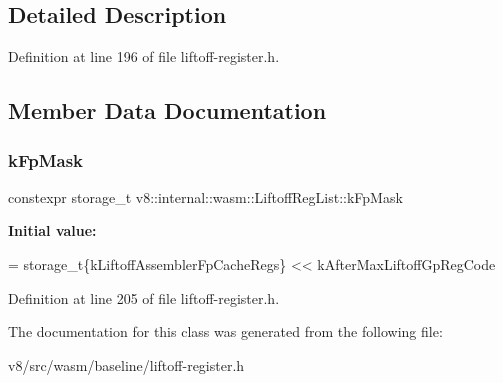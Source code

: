 \subsection{Detailed Description}


Definition at line 196 of file liftoff-\/register.\+h.



\subsection{Member Data Documentation}
\mbox{\label{classv8_1_1internal_1_1wasm_1_1LiftoffRegList_a27209310c19f408fe933ab1fe99edc1a}} 
\subsubsection{\texorpdfstring{k\+Fp\+Mask}{kFpMask}}
{\footnotesize\ttfamily constexpr storage\+\_\+t v8\+::internal\+::wasm\+::\+Liftoff\+Reg\+List\+::k\+Fp\+Mask\hspace{0.3cm}{\ttfamily [static]}}

{\bfseries Initial value\+:}
\begin{DoxyCode}
= storage\_t\{kLiftoffAssemblerFpCacheRegs\}
                                       << kAfterMaxLiftoffGpRegCode
\end{DoxyCode}


Definition at line 205 of file liftoff-\/register.\+h.



The documentation for this class was generated from the following file\+:\begin{DoxyCompactItemize}
\item 
v8/src/wasm/baseline/liftoff-\/register.\+h\end{DoxyCompactItemize}
